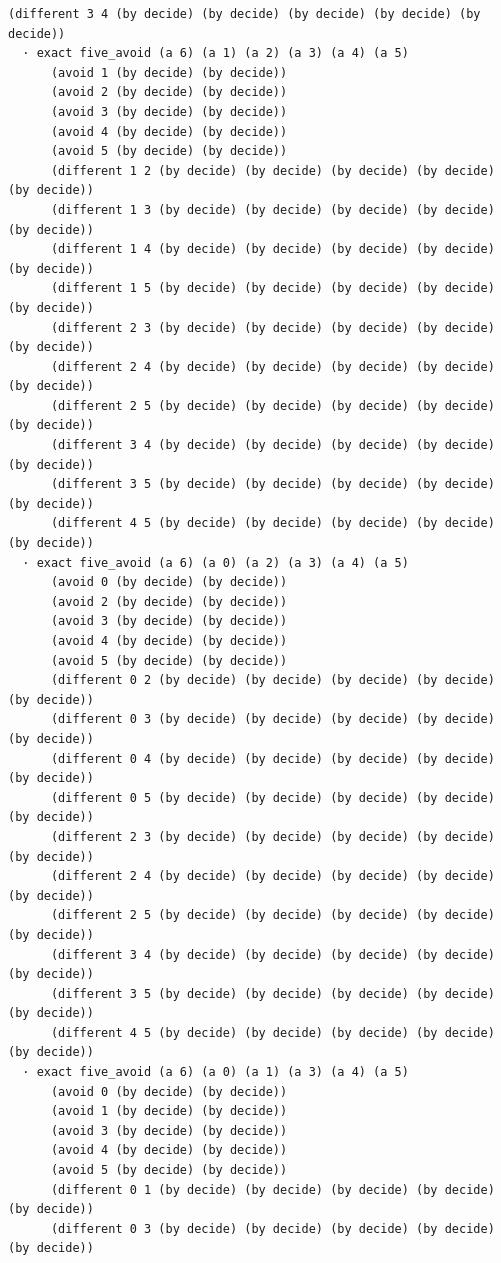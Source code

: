\documentclass[11pt,a4paper]{article}
\begin{document}
\begin{Verbatim}[breaklines,breakanywhere,fontsize=\footnotesize]
      (different 3 4 (by decide) (by decide) (by decide) (by decide) (by decide))
  · exact five_avoid (a 6) (a 1) (a 2) (a 3) (a 4) (a 5)
      (avoid 1 (by decide) (by decide))
      (avoid 2 (by decide) (by decide))
      (avoid 3 (by decide) (by decide))
      (avoid 4 (by decide) (by decide))
      (avoid 5 (by decide) (by decide))
      (different 1 2 (by decide) (by decide) (by decide) (by decide) (by decide))
      (different 1 3 (by decide) (by decide) (by decide) (by decide) (by decide))
      (different 1 4 (by decide) (by decide) (by decide) (by decide) (by decide))
      (different 1 5 (by decide) (by decide) (by decide) (by decide) (by decide))
      (different 2 3 (by decide) (by decide) (by decide) (by decide) (by decide))
      (different 2 4 (by decide) (by decide) (by decide) (by decide) (by decide))
      (different 2 5 (by decide) (by decide) (by decide) (by decide) (by decide))
      (different 3 4 (by decide) (by decide) (by decide) (by decide) (by decide))
      (different 3 5 (by decide) (by decide) (by decide) (by decide) (by decide))
      (different 4 5 (by decide) (by decide) (by decide) (by decide) (by decide))
  · exact five_avoid (a 6) (a 0) (a 2) (a 3) (a 4) (a 5)
      (avoid 0 (by decide) (by decide))
      (avoid 2 (by decide) (by decide))
      (avoid 3 (by decide) (by decide))
      (avoid 4 (by decide) (by decide))
      (avoid 5 (by decide) (by decide))
      (different 0 2 (by decide) (by decide) (by decide) (by decide) (by decide))
      (different 0 3 (by decide) (by decide) (by decide) (by decide) (by decide))
      (different 0 4 (by decide) (by decide) (by decide) (by decide) (by decide))
      (different 0 5 (by decide) (by decide) (by decide) (by decide) (by decide))
      (different 2 3 (by decide) (by decide) (by decide) (by decide) (by decide))
      (different 2 4 (by decide) (by decide) (by decide) (by decide) (by decide))
      (different 2 5 (by decide) (by decide) (by decide) (by decide) (by decide))
      (different 3 4 (by decide) (by decide) (by decide) (by decide) (by decide))
      (different 3 5 (by decide) (by decide) (by decide) (by decide) (by decide))
      (different 4 5 (by decide) (by decide) (by decide) (by decide) (by decide))
  · exact five_avoid (a 6) (a 0) (a 1) (a 3) (a 4) (a 5)
      (avoid 0 (by decide) (by decide))
      (avoid 1 (by decide) (by decide))
      (avoid 3 (by decide) (by decide))
      (avoid 4 (by decide) (by decide))
      (avoid 5 (by decide) (by decide))
      (different 0 1 (by decide) (by decide) (by decide) (by decide) (by decide))
      (different 0 3 (by decide) (by decide) (by decide) (by decide) (by decide))

\end{Verbatim}
\end{document}
